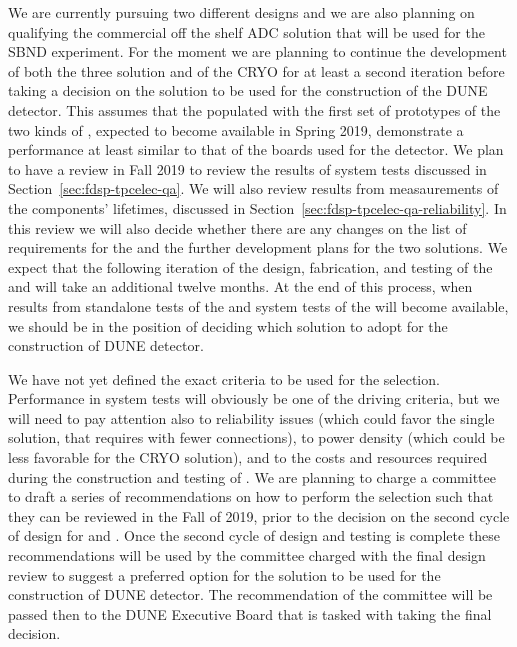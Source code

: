 We are currently pursuing two different  designs
and we are also planning on qualifying the commercial off the
shelf ADC solution that will be used for the SBND experiment.
For the moment we are planning to continue the development of
both the three  solution and of the CRYO 
for at least a second iteration before taking a decision on
the  solution to be used for the construction of
the DUNE  detector. This assumes that the 
populated with the first set of prototypes of the two kinds of
, expected to become available in Spring 2019,
demonstrate a performance at least similar to that of the
boards used for the  detector. We plan to have a
review in Fall 2019 to review the results of system tests
discussed in Section~\ref{sec:fdsp-tpcelec-qa}. We will also
review results from measaurements of the components' lifetimes,
discussed in Section~\ref{sec:fdsp-tpcelec-qa-reliability}. In this review
we will also decide whether there are any changes on the list
of requirements for the  and the further development
plans for the two solutions. We expect that the following iteration
of the design, fabrication, and testing of the  and
 will take an additional twelve months. At
the end of this process, when results from standalone tests of the
 and system tests of the  will become
available, we should be in the position of deciding which 
solution to adopt for the construction of DUNE  detector.

We have not yet defined the exact criteria to be used for the
 selection. Performance in system tests will obviously
be one of the driving criteria, but we will need to pay attention
also to reliability issues (which could favor the single 
solution, that requires  with fewer connections), to
power density (which could be less favorable for the CRYO solution),
and to the costs and resources required during the construction
and testing of . We are planning to charge a committee
to draft a series of recommendations on how to perform the
 selection such that they can be reviewed in the Fall
of 2019, prior to the decision on the second cycle of design for
 and . Once the second cycle of design
and testing is complete these recommendations will be used by the
committee charged with the final design review to suggest a
preferred option for the  solution to be used for the
construction of DUNE  detector. The recommendation of
the committee will be passed then to the DUNE Executive Board
that is tasked with taking the final  decision.

